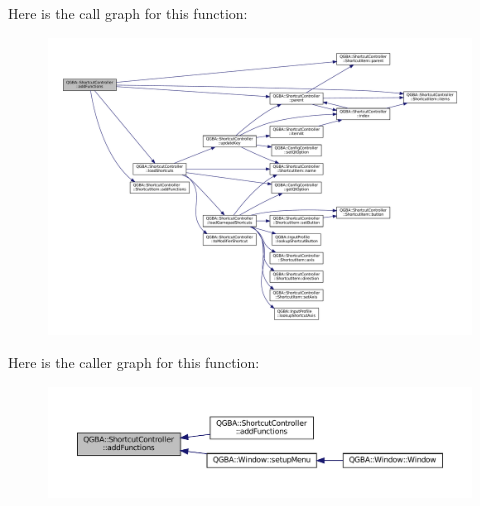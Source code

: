 Here is the call graph for this function\+:
\nopagebreak
\begin{figure}[H]
\begin{center}
\leavevmode
\includegraphics[width=350pt]{class_q_g_b_a_1_1_shortcut_controller_a241282f4512343d3fc9c4c1e7667181b_cgraph}
\end{center}
\end{figure}
Here is the caller graph for this function\+:
\nopagebreak
\begin{figure}[H]
\begin{center}
\leavevmode
\includegraphics[width=350pt]{class_q_g_b_a_1_1_shortcut_controller_a241282f4512343d3fc9c4c1e7667181b_icgraph}
\end{center}
\end{figure}
\mbox{\label{class_q_g_b_a_1_1_shortcut_controller_a839498b4fa07fa34756723cf34ccb6a6}} 

